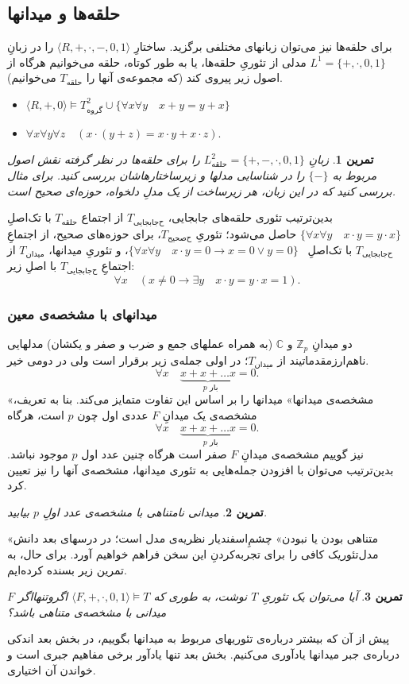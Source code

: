 \documentclass[12pt,a4paper]{report}
\theoremstyle{colorhead}
\newtheorem{tam}{تمرین}
\begin{document}
\subsection{حلقه‌ها و میدانها}
برای حلقه‌ها نیز می‌توان زبانهای مختلفی برگزید. 
ساختارِ
$\langle R,+,\cdot,-,0,1\rangle$
را
در زبانِ
\mbox{$L^1_{\text{}}=\{+,\cdot,0,1\}$}
مدلی از تئوریِ حلقه‌ها،‌ یا به طور کوتاه،
حلقه‌ 
می‌خوانیم هرگاه از اصول زیر پیروی کند (که مجموعه‌ی آنها را 
$T_{\text{حلقه}}$
می‌خوانیم).
\begin{itemize}
\item 
$\langle R,+,0\rangle \models T^2_{\text{گروه}}\cup \{\forall x\forall y \quad x+y=y+x\}$
\item 
$\forall x\forall y\forall z\quad \left(x\cdot(y+z)=x\cdot y+x\cdot z\right)$.
\end{itemize}
\begin{tam}
زبانِ
$L^2_{\text{حلقه}}=\{+,-,\cdot,0,1\}$
را برای حلقه‌ها در نظر گرفته نقش اصول مربوط به
$\{-\}$
را در شناسایی مدلها و زیرساختارهاشان بررسی کنید. برای مثال بررسی کنید که در این زبان، هر زیرساخت از یک مدلِ دلخواه، حوزه‌ای صحیح است.
\end{tam}
بدین‌ترتیب تئوری حلقه‌های جابجایی،
$T_{\text{ح‌جابجایی}}$
 از اجتماع
$T_{\text{حلقه}}$
با
تک‌اصلِ
\mbox{$\{\forall x\forall y\quad x\cdot y=y\cdot x\}$}
حاصل می‌شود؛ تئوریِ
$T_{\text{ح‌صحیح}}$،
برای حوزه‌های صحیح، از اجتماعِ
$T_{\text{ح‌جابجایی}}$
با تک‌اصلِ
\mbox{
$\{\forall x\forall y\quad x\cdot y=0\to x=0\vee y=0\}$}،
و تئوریِ میدانها،
$T_{\text{میدان}}$
از اجتماعِ
$T_{\text{ح‌جابجایی}}$
با اصلِ
زیر:
\[
\forall x \quad (x\not=0\to \exists y\quad x\cdot y=y\cdot x=1).
\]
\subsubsection{میدانهای با مشخصه‌ی معین}
دو میدانِ
$\mathbb{Z}_p$
و
$\mathbb{C}$
(به همراه عملهای جمع  و ضرب و صفر و  یکشان)  مدلهایی 
ناهم‌ارز‌مقدماتیند
از
$T_{\text{میدان}}$؛
در اولی جمله‌ی زیر برقرار است ولی در دومی خیر.
\[
\forall x\quad \underbrace{x+x+\ldots x}_{\text{ $p$ بار}}=0.
\]
«مشخصه‌ی میدانها» میدانها را بر اساس این تفاوت متمایز می‌کند.
بنا به تعریف، مشخصه‌ی یک میدانِ
$F$
عددی اول چون 
$p$
است، هرگاه
\[
\forall x\quad \underbrace{x+x+\ldots x}_{\text{ $p$ بار}}=0.
\]
نیز گوییم مشخصه‌ی میدانِ
$F$
صفر است هرگاه چنین عدد اول
$p$
موجود نباشد. بدین‌ترتیب می‌توان با افزودن جمله‌هایی به تئوری‌ میدانها، مشخصه‌ی آنها را نیز تعیین کرد.
\begin{tam}
میدانی نامتناهی با مشخصه‌ی عدد اولِ
$p$
بیابید.
\end{tam}
«متناهی بودن یا نبودن» چشم‌ِاسفندیار نظریه‌ی مدل است؛ در درسهای بعد دانش مدل‌تئوریک کافی را
برای تجربه‌کردنِ این سخن فراهم خواهیم آورد. 
برای حال، به تمرین زیر بسنده کرده‌ایم.
\begin{tam}
آیا می‌توان یک تئوریِ
$T$
نوشت، به طوری که
$\langle F,+,\cdot,0,1\rangle\models T$
اگروتنهااگر
$F$
میدانی با مشخصه‌ی متناهی باشد؟
\end{tam}
پیش از آن که بیشتر درباره‌ی تئوریهای مربوط به میدانها بگوییم، در بخش بعد اندکی درباره‌ی جبر میدانها یادآوری می‌کنیم. بخش بعد تنها یادآور برخی مفاهیم جبری است و خواندن آن اختیاری. 
\end{document}
